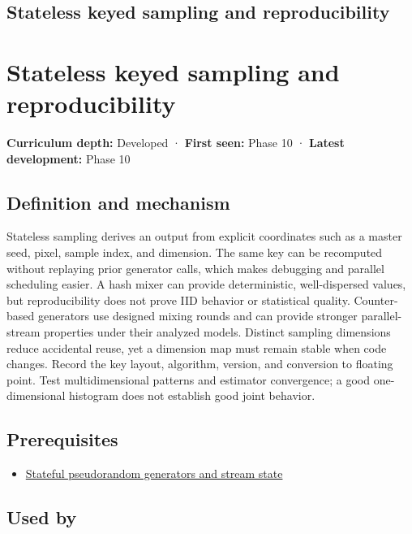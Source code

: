 \hypertarget{appendix-daaf25bfd3a0}{}
\section*{Stateless keyed sampling and reproducibility}
\chapter{Stateless keyed sampling and reproducibility}\label{appendix-daaf25bfd3a0-stateless-keyed-sampling-and-reproducibility}

\textbf{Curriculum depth:} Developed · \textbf{First seen:} Phase 10 · \textbf{Latest development:} Phase 10

\section{Definition and mechanism}\label{appendix-daaf25bfd3a0-definition-and-mechanism}

Stateless sampling derives an output from explicit coordinates such as a master seed, pixel, sample index, and dimension. The same key can be recomputed without replaying prior generator calls, which makes debugging and parallel scheduling easier. A hash mixer can provide deterministic, well-dispersed values, but reproducibility does not prove IID behavior or statistical quality. Counter-based generators use designed mixing rounds and can provide stronger parallel-stream properties under their analyzed models. Distinct sampling dimensions reduce accidental reuse, yet a dimension map must remain stable when code changes. Record the key layout, algorithm, version, and conversion to floating point. Test multidimensional patterns and estimator convergence; a good one-dimensional histogram does not establish good joint behavior.

\section{Prerequisites}\label{appendix-daaf25bfd3a0-prerequisites}

\begin{itemize}
\tightlist
\item
  \hyperref[appendix-e0f7c7e08f3a]{Stateful pseudorandom generators and stream state}
\end{itemize}

\section{Used by}\label{appendix-daaf25bfd3a0-used-by}

